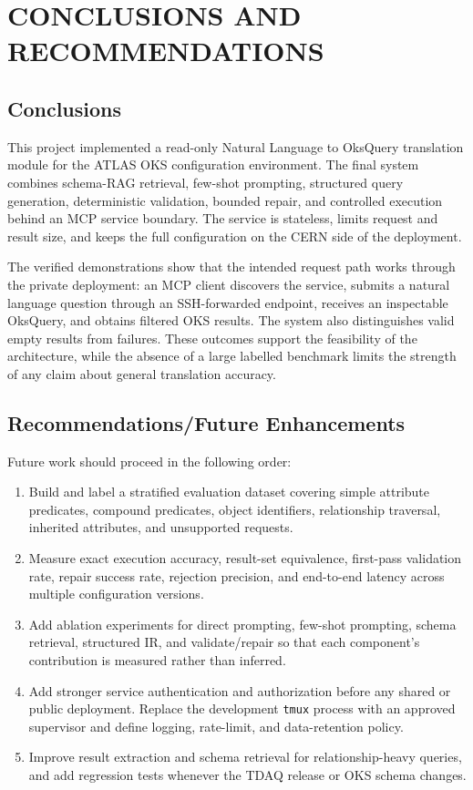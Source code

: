 \documentclass[12pt, a4paper]{report}
\begin{document}
\chapter{CONCLUSIONS AND RECOMMENDATIONS}

\section{Conclusions}
This project implemented a read-only Natural Language to OksQuery translation
module for the ATLAS OKS configuration environment. The final system combines
schema-RAG retrieval, few-shot prompting, structured query generation,
deterministic validation, bounded repair, and controlled execution behind an
MCP service boundary. The service is stateless, limits request and result size,
and keeps the full configuration on the CERN side of the deployment.

The verified demonstrations show that the intended request path works through
the private deployment: an MCP client discovers the service, submits a natural
language question through an SSH-forwarded endpoint, receives an inspectable
OksQuery, and obtains filtered OKS results. The system also distinguishes valid
empty results from failures. These outcomes support the feasibility of the
architecture, while the absence of a large labelled benchmark limits the
strength of any claim about general translation accuracy.

\section{Recommendations/Future Enhancements}
Future work should proceed in the following order:
\begin{enumerate}[label=(\roman*)]
  \item Build and label a stratified evaluation dataset covering simple
  attribute predicates, compound predicates, object identifiers, relationship
  traversal, inherited attributes, and unsupported requests.
  \item Measure exact execution accuracy, result-set equivalence, first-pass
  validation rate, repair success rate, rejection precision, and end-to-end
  latency across multiple configuration versions.
  \item Add ablation experiments for direct prompting, few-shot prompting,
  schema retrieval, structured IR, and validate/repair so that each component's
  contribution is measured rather than inferred.
  \item Add stronger service authentication and authorization before any shared
  or public deployment. Replace the development \texttt{tmux} process with an
  approved supervisor and define logging, rate-limit, and data-retention policy.
  \item Improve result extraction and schema retrieval for relationship-heavy
  queries, and add regression tests whenever the TDAQ release or OKS schema
  changes.
\end{enumerate}
\end{document}
